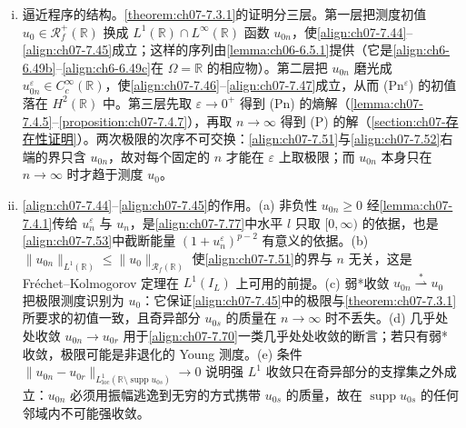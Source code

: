 ﻿\documentclass[../../main.tex]{subfiles}%
\begin{document}
\begin{remark}\label{remark:ch07-初值逼近}
\begin{enumerate}[(i)]
\item 逼近程序的结构。\cref{theorem:ch07-7.3.1}的证明分三层。第一层把测度初值 $u_0\in\mathscr{R}_f^+(\mathbb{R})$ 换成 $L^1(\mathbb{R})\cap L^\infty(\mathbb{R})$ 函数 $u_{0n}$，使\eqref{align:ch07-7.44}--\eqref{align:ch07-7.45}成立；这样的序列由\cref{lemma:ch06-6.5.1}提供（它是\eqref{align:ch6-6.49b}--\eqref{align:ch6-6.49c}在 $\Omega=\mathbb{R}$ 的相应物）。第二层把 $u_{0n}$ 磨光成 $u_{0n}^\varepsilon\in C^\infty_c(\mathbb{R})$，使\eqref{align:ch07-7.46}--\eqref{align:ch07-7.47}成立，从而 (Pn$^\varepsilon$) 的初值落在 $H^2(\mathbb{R})$ 中。第三层先取 $\varepsilon\to0^+$ 得到 (Pn) 的熵解（\cref{lemma:ch07-7.4.5}--\cref{proposition:ch07-7.4.7}），再取 $n\to\infty$ 得到 (P) 的解（\cref{section:ch07-存在性证明}）。两次极限的次序不可交换：\eqref{align:ch07-7.51}与\eqref{align:ch07-7.52}右端的界只含 $u_{0n}$，故对每个固定的 $n$ 才能在 $\varepsilon$ 上取极限；而 $u_{0n}$ 本身只在 $n\to\infty$ 时才趋于测度 $u_0$。
\item \eqref{align:ch07-7.44}--\eqref{align:ch07-7.45}的作用。(a) 非负性 $u_{0n}\geqslant0$ 经\cref{lemma:ch07-7.4.1}传给 $u_n^\varepsilon$ 与 $u_n$，是\eqref{align:ch07-7.77}中水平 $l$ 只取 $[0,\infty)$ 的依据，也是\eqref{align:ch07-7.53}中截断能量 $(1+u_n^\varepsilon)^{p-2}$ 有意义的依据。(b) $\|u_{0n}\|_{L^1(\mathbb{R})}\leqslant\|u_0\|_{\mathscr{R}_f(\mathbb{R})}$ 使\eqref{align:ch07-7.51}的界与 $n$ 无关，这是 Fréchet--Kolmogorov 定理在 $L^1(I_L)$ 上可用的前提。(c) 弱*收敛 $u_{0n}\stackrel{*}{\rightharpoonup}u_0$ 把极限测度识别为 $u_0$：它保证\eqref{align:ch07-7.45}中的极限与\cref{theorem:ch07-7.3.1}所要求的初值一致，且奇异部分 $u_{0s}$ 的质量在 $n\to\infty$ 时不丢失。(d) 几乎处处收敛 $u_{0n}\to u_{0r}$ 用于\eqref{align:ch07-7.70}一类几乎处处收敛的断言；若只有弱*收敛，极限可能是非退化的 Young 测度。(e) 条件 $\|u_{0n}-u_{0r}\|_{L^1_{\mathrm{loc}}(\mathbb{R}\setminus\operatorname{supp}u_{0s})}\to0$ 说明强 $L^1$ 收敛只在奇异部分的支撑集之外成立：$u_{0n}$ 必须用振幅逃逸到无穷的方式携带 $u_{0s}$ 的质量，故在 $\operatorname{supp}u_{0s}$ 的任何邻域内不可能强收敛。

\end{enumerate}
\end{remark}
\end{document}
